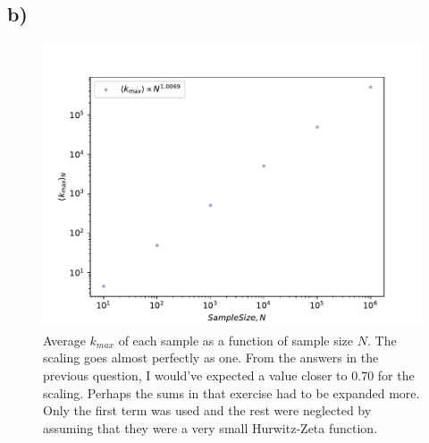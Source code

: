 \documentclass{article}
\begin{document}
\subsection{b)}

\begin{figure}[h!]
\includegraphics[width=\linewidth]{Q07/kmaxAverageVsSampleSize.pdf}
\caption{Average $k_{max}$ of each sample as a function of sample size $N$. The scaling goes almost perfectly as one. From the answers in the previous question, I would've expected a value closer to $0.70$ for the scaling. Perhaps the sums in that exercise had to be expanded more. Only the first term was used and the rest were neglected by assuming that they were a very small Hurwitz-Zeta function.}
\label{fig:envelope}
\end{figure}
\end{document}
